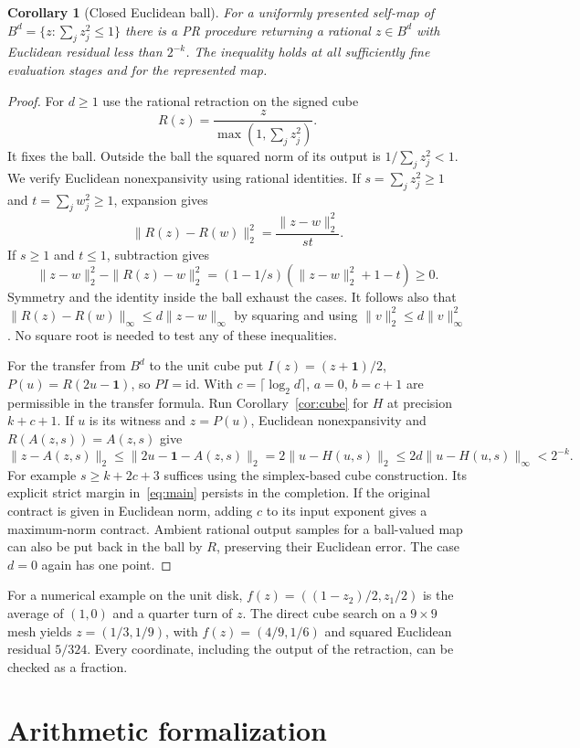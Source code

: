 \documentclass[11pt,letterpaper]{article}
\newcommand{\norm}[1]{\lVert #1\rVert_\infty}
\theoremstyle{claim}\newtheorem{theorem}{Theorem}\newtheorem{lemma}[theorem]{Lemma}
\newtheorem{corollary}[theorem]{Corollary}
\begin{document}
\begin{corollary}[Closed Euclidean ball]\label{cor:ball}
For a uniformly presented self-map of
$B^d=\{z : \sum_j z_j^2\le1\}$ there is a PR procedure returning
a rational $z\in B^d$ with Euclidean residual less than $2^{-k}$.
The inequality holds at all sufficiently fine evaluation stages and for
the represented map.
\end{corollary}
\begin{proof}
For $d\ge1$ use the rational retraction on the signed cube
\[
 R(z)=\frac{z}{\max(1,\sum_j z_j^2)}.
\]
It fixes the ball. Outside the ball the squared norm of its output is
$1/\sum_j z_j^2<1$. We verify Euclidean nonexpansivity using rational
identities. If $s=\sum_j z_j^2\ge1$ and $t=\sum_j w_j^2\ge1$, expansion gives
\[
   \|R(z)-R(w)\|_2^2=\frac{\|z-w\|_2^2}{st}.
\]
If $s\ge1$ and $t\le1$, subtraction gives
\[
 \|z-w\|_2^2-\|R(z)-w\|_2^2
  =(1-1/s)(\|z-w\|_2^2+1-t)\ge0.
\]
Symmetry and the identity inside the ball exhaust the cases. It follows
also that $\norm{R(z)-R(w)}\le d\norm{z-w}$ by squaring and using
$\|v\|_2^2\le d\norm v^2$. No square root is needed to test any of
these inequalities.

For the transfer from $B^d$ to the unit cube put $I(z)=(z+\mathbf1)/2$,
$P(u)=R(2u-\mathbf1)$, so $PI=\mathrm{id}$.
With $c=\lceil\log_2 d\rceil$, $a=0$, $b=c+1$ are permissible in
the transfer formula. Run Corollary~\ref{cor:cube} for $H$ at precision
$k+c+1$. If $u$ is its witness and $z=P(u)$, Euclidean
nonexpansivity and $R(A(z,s))=A(z,s)$ give
\[
 \|z-A(z,s)\|_2\le \|2u-\mathbf1-A(z,s)\|_2
       =2\|u-H(u,s)\|_2\le 2d\norm{u-H(u,s)}<2^{-k}.
\]
For example $s\ge k+2c+3$ suffices using the simplex-based cube construction.
Its explicit strict margin in~\eqref{eq:main} persists in the completion.
If the original contract is given in Euclidean norm, adding $c$ to its
input exponent gives a maximum-norm contract. Ambient rational output
samples for a ball-valued map can also be put back in the ball by $R$,
preserving their Euclidean error. The case $d=0$ again has one point.
\end{proof}

For a numerical example on the unit disk, $f(z)=((1-z_2)/2,z_1/2)$ is the
average of $(1,0)$ and a quarter turn of $z$. The direct cube search on a
$9\times9$ mesh yields $z=(1/3,1/9)$, with
$f(z)=(4/9,1/6)$ and squared Euclidean residual $5/324$.
Every coordinate, including the output of the retraction, can be checked as
a fraction.

\section{Arithmetic formalization}\label{sec:formal}
\end{document}
